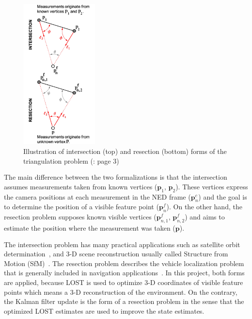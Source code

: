 \begin{figure}[!ht]
    \centering
    \includegraphics[width=0.35\textwidth]{figures/intersec-resec.png}
    \caption{Illustration of intersection (top) and resection (bottom) forms of the triangulation problem (\cite{absolute-triangulation}: page 3)}\label{fig:intersec-resec}
\end{figure}

The main difference between the two formalizations is that the intersection assumes measurements taken from known vertices ($\mathbf{p}_1$, $\mathbf{p}_2$). These vertices express the camera positions at each measurement in the NED frame ($\mathbf{p}_n^c$) and the goal is to determine the position of a visible feature point ($\mathbf{p}_n^f$). On the other hand, the resection problem supposes known visible vertices ($\mathbf{p}_{n, 1}^f$, $\mathbf{p}_{n, 2}^f$) and aims to estimate the position where the measurement was taken ($\mathbf{p}$).

The intersection problem has many practical applications such as satellite orbit determination~\cite{TriagulationSpaceOrb1, TriagulationSpaceOrb2}, and 3-D scene reconstruction usually called Structure from Motion (SfM)~\cite{Triang3D1, Triang3D2, Triang3D3}. The resection problem describes the vehicle localization problem that is generally included in navigation applications~\cite{rel-nav-1, rel-nav-2, TriangNav}. In this project, both forms are applied, because LOST is used to optimize 3-D coordinates of visible feature points which means a 3-D reconstruction of the environment. On the contrary, the Kalman filter update is the form of a resection problem in the sense that the optimized LOST estimates are used to improve the state estimates.

